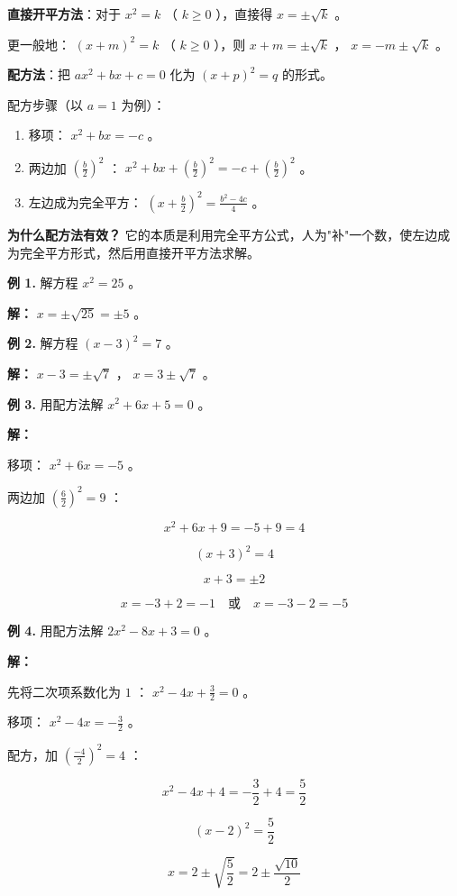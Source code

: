 \begin{understand}


\textbf{直接开平方法}：对于 $x^2 = k$ （ $k \geq 0$ ），直接得 $x = \pm\sqrt{k}$ 。

更一般地： $(x + m)^2 = k$ （ $k \geq 0$ ），则 $x + m = \pm\sqrt{k}$ ， $x = -m \pm \sqrt{k}$ 。

\textbf{配方法}：把 $ax^2 + bx + c = 0$ 化为 $(x + p)^2 = q$ 的形式。

配方步骤（以 $a = 1$ 为例）：

\begin{enumerate}
  \item 移项： $x^2 + bx = -c$ 。
  \item 两边加 $\left(\frac{b}{2}\right)^2$ ： $x^2 + bx + \left(\frac{b}{2}\right)^2 = -c + \left(\frac{b}{2}\right)^2$ 。
  \item 左边成为完全平方： $\left(x + \frac{b}{2}\right)^2 = \frac{b^2 - 4c}{4}$ 。
\end{enumerate}


\textbf{为什么配方法有效？} 它的本质是利用完全平方公式，人为"补"一个数，使左边成为完全平方形式，然后用直接开平方法求解。

\end{understand}

\begin{workedexamples}


\textbf{例 1.} 解方程 $x^2 = 25$ 。

\textbf{解：} $x = \pm\sqrt{25} = \pm 5$ 。

\textbf{例 2.} 解方程 $(x - 3)^2 = 7$ 。

\textbf{解：} $x - 3 = \pm\sqrt{7}$ ， $x = 3 \pm \sqrt{7}$ 。

\textbf{例 3.} 用配方法解 $x^2 + 6x + 5 = 0$ 。

\textbf{解：}

移项： $x^2 + 6x = -5$ 。

两边加 $\left(\frac{6}{2}\right)^2 = 9$ ：

\[
x^2 + 6x + 9 = -5 + 9 = 4
\]


\[
(x + 3)^2 = 4
\]


\[
x + 3 = \pm 2
\]


\[
x = -3 + 2 = -1 \quad \text{或} \quad x = -3 - 2 = -5
\]


\textbf{例 4.} 用配方法解 $2x^2 - 8x + 3 = 0$ 。

\textbf{解：}

先将二次项系数化为 $1$ ： $x^2 - 4x + \frac{3}{2} = 0$ 。

移项： $x^2 - 4x = -\frac{3}{2}$ 。

配方，加 $\left(\frac{-4}{2}\right)^2 = 4$ ：

\[
x^2 - 4x + 4 = -\frac{3}{2} + 4 = \frac{5}{2}
\]


\[
(x - 2)^2 = \frac{5}{2}
\]


\[
x = 2 \pm \sqrt{\frac{5}{2}} = 2 \pm \frac{\sqrt{10}}{2}
\]


\end{workedexamples}

